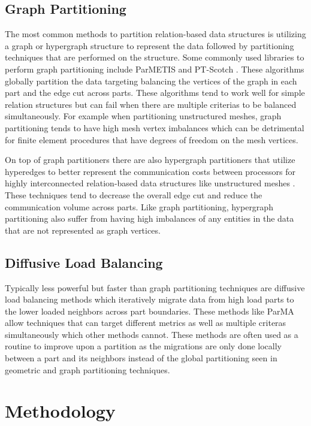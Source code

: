 \documentclass[a4paper]{article}
\begin{document}
\subsection{Graph Partitioning}
The most common methods to partition relation-based data structures is utilizing a graph or hypergraph structure to represent the data followed by partitioning techniques that are performed on the structure. Some commonly used libraries to perform graph partitioning include ParMETIS \cite{parmetis4} and PT-Scotch \cite{scotch2009}. These algorithms globally partition the data targeting balancing the vertices of the graph in each part and the edge cut across parts. These algorithms tend to work well for simple relation structures but can fail when there are multiple criterias to be balanced simultaneously. For example when partitioning unstructured meshes, graph partitioning tends to have high mesh vertex imbalances which can be detrimental for finite element procedures that have degrees of freedom on the mesh vertices. 

On top of graph partitioners there are also hypergraph partitioners that utilize hyperedges to better represent the communication costs between processors for highly interconnected relation-based data structures like unstructured meshes \cite{devine2002zoltan}. These techniques tend to decrease the overall edge cut and reduce the communication volume across parts. Like graph partitioning, hypergraph partitioning also suffer from having high imbalances of any entities in the data that are not represented as graph vertices. 

\subsection{Diffusive Load Balancing}
Typically less powerful but faster than graph partitioning techniques are diffusive load balancing methods which iteratively migrate data from high load parts to the lower loaded neighbors across part boundaries. These methods like ParMA \cite{SmithParma2015} allow techniques that can target different metrics as well as multiple criteras simultaneously which other methods cannot. These methods are often used as a routine to improve upon a partition as the migrations are only done locally between a part and its neighbors instead of the global partitioning seen in geometric and graph partitioning techniques.

\section{Methodology}
\end{document}

